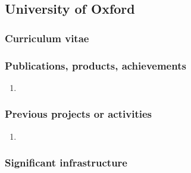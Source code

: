 \subsection*{University of Oxford}




\subsubsection*{Curriculum vitae}




\subsubsection*{Publications, products, achievements}

\begin{enumerate}
\item {}
\end{enumerate}

\subsubsection*{Previous projects or activities}

\begin{enumerate}
\item {}
\end{enumerate}

\subsubsection*{Significant infrastructure}


